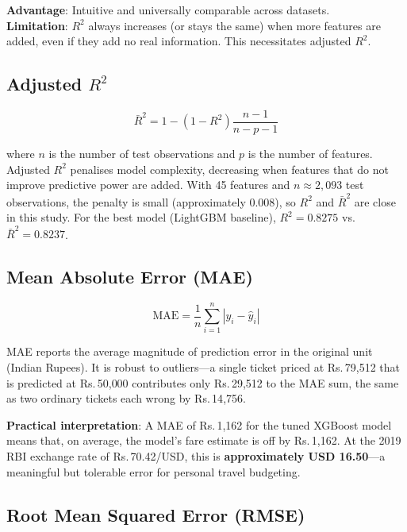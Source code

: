 \documentclass[12pt, a4paper]{article}
\begin{document}
\textbf{Advantage}: Intuitive and universally comparable across datasets.\\
\textbf{Limitation}: $R^2$ always increases (or stays the same) when more
features are added, even if they add no real information.  This necessitates
adjusted $R^2$.

\subsection{Adjusted $R^2$}

\begin{equation}
\bar{R}^2 = 1 - (1 - R^2)\frac{n-1}{n-p-1}
\end{equation}

where $n$ is the number of test observations and $p$ is the number of features.
Adjusted $R^2$ penalises model complexity, decreasing when features that do
not improve predictive power are added.  With 45 features and $n \approx 2{,}093$
test observations, the penalty is small (approximately 0.008), so $R^2$ and
$\bar{R}^2$ are close in this study.  For the best model (LightGBM baseline),
$R^2 = 0.8275$ vs.\ $\bar{R}^2 = 0.8237$.

\subsection{Mean Absolute Error (MAE)}

\begin{equation}
\text{MAE} = \frac{1}{n}\sum_{i=1}^{n}|y_i - \hat{y}_i|
\end{equation}

MAE reports the average magnitude of prediction error in the original unit
(Indian Rupees).  It is robust to outliers---a single ticket priced at
Rs.\,79{,}512 that is predicted at Rs.\,50{,}000 contributes only
Rs.\,29{,}512 to the MAE sum, the same as two ordinary tickets each wrong
by Rs.\,14{,}756.

\textbf{Practical interpretation}: A MAE of Rs.\,1{,}162 for the tuned XGBoost
model means that, on average, the model's fare estimate is off by Rs.\,1{,}162.
At the 2019 RBI exchange rate of Rs.\,70.42/USD, this is \textbf{approximately
USD 16.50}---a meaningful but tolerable error for personal travel budgeting.

\subsection{Root Mean Squared Error (RMSE)}
\end{document}
